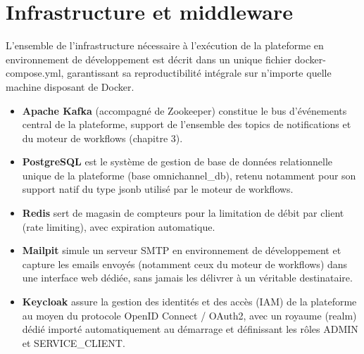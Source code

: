 \documentclass[12pt,a4paper]{report}
\begin{document}
\section{Infrastructure et middleware}

L'ensemble de l'infrastructure nécessaire à l'exécution de la plateforme en environnement de développement est décrit dans un unique fichier docker-compose.yml, garantissant sa reproductibilité intégrale sur n'importe quelle machine disposant de Docker.

\begin{itemize}
  \item \textbf{Apache Kafka} (accompagné de Zookeeper) constitue le bus d'événements central de la plateforme, support de l'ensemble des topics de notifications et du moteur de workflows (chapitre 3).
  \item \textbf{PostgreSQL} est le système de gestion de base de données relationnelle unique de la plateforme (base omnichannel\_db), retenu notamment pour son support natif du type jsonb utilisé par le moteur de workflows.
  \item \textbf{Redis} sert de magasin de compteurs pour la limitation de débit par client (rate limiting), avec expiration automatique.
  \item \textbf{Mailpit} simule un serveur SMTP en environnement de développement et capture les emails envoyés (notamment ceux du moteur de workflows) dans une interface web dédiée, sans jamais les délivrer à un véritable destinataire.
  \item \textbf{Keycloak} assure la gestion des identités et des accès (IAM) de la plateforme au moyen du protocole OpenID Connect / OAuth2, avec un royaume (realm) dédié importé automatiquement au démarrage et définissant les rôles ADMIN et SERVICE\_CLIENT.
\end{itemize}
\end{document}
